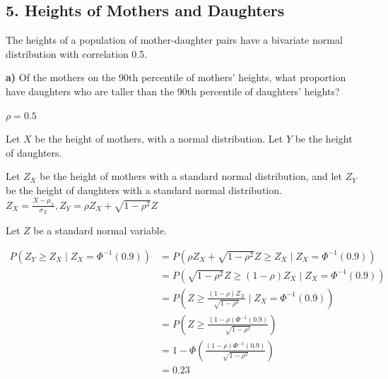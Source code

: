 \documentclass[11pt]{article}
\begin{document}
\begin{centering}
	

\end{centering}




    \newpage

    \hypertarget{heights-of-mothers-and-daughters}{%
\subsection{5. Heights of Mothers and
Daughters}\label{heights-of-mothers-and-daughters}}

The heights of a population of mother-daughter pairs have a bivariate
normal distribution with correlation 0.5.

\textbf{a)} Of the mothers on the 90th percentile of mothers' heights,
what proportion have daughters who are taller than the 90th percentile
of daughters' heights?

$\rho = 0.5$ 

Let $X$ be the height of mothers, with a normal distribution. Let $Y$ be the height of daughters. 

Let $Z_{X}$ be the height of mothers with a standard normal distribution, and let $Z_{Y}$ be the height of daughters with a standard normal distribution. $Z_{X} = \frac{X-\mu _{x}}{\sigma_{X}}, Z_{Y} = \rho Z_{X} + \sqrt{1-\rho^{2}} Z$ 

Let $Z$ be a standard normal variable.

\begin{align*}
	P(Z_{Y} \ge Z_{X} \mid Z_{X} = \Phi^{-1}(0.9)) &= P(\rho Z_{X} + \sqrt{1-\rho^{2}}Z  \ge Z_{X} \mid Z_{X} = \Phi^{-1}(0.9)) \\
				    &= P(\sqrt{1-\rho^{2}}Z \ge (1-\rho)Z_{X} \mid Z_{X} = \Phi^{-1}(0.9))  \\
				    &= P(Z \ge \frac{(1-\rho)Z_{X}}{\sqrt{1-\rho^{2}}} \mid Z_{X} = \Phi^{-1}(0.9) ) \\
				    &= P(Z \ge \frac{(1-\rho) \Phi^{-1}(0.9)}{\sqrt{1-\rho^{2}}}) \\
				    &= 1 - \Phi\left( \frac{(1-\rho)\Phi^{-1}(0.9)}{\sqrt{1-\rho^{2}} } \right)  \\
				    &= 0.23 \\
\end{align*}
\end{document}
